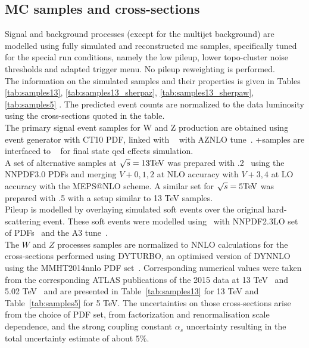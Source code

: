     \subsection{MC samples and cross-sections}
    Signal and background processes (except for the multijet background) are modelled using fully simulated and reconstructed \gls{mc} samples, specifically tuned for the special run conditions, namely the low pileup, lower topo-cluster noise thresholds and adapted trigger menu. No pileup reweighting is performed.\\
    The information on the simulated samples and their properties is given in Tables \ref{tab:samples13}, \ref{tab:samples13_sherpaz}, \ref{tab:samples13_sherpaw},  \ref{tab:samples5} \cite{Kretzschmar:2657141}. The predicted event counts are normalized to the data luminosity using the cross-sections quoted in the table.\\
    The primary signal event samples for W and Z production are obtained using \Powheg~\cite{Nason:2004rx,Frixione:2007vw,Alioli:2008gx,Alioli:2010xd} event generator with CT10 PDF, linked with \Pythia~\cite{pythia} with AZNLO tune~\cite{STDM-2012-23}. \Powheg+\Pythia samples are interfaced to \Photos~\cite{Golonka:2005pn}  for final state \gls{qed} effects simulation.\\
    A set of alternative samples at $\sqrt{s} = 13\text{Te\kern -0.1em V}$ was prepared with .2~\cite{Hoche:2010kg} using the NNPDF3.0 PDFs and merging
    $V+0,1,2$ at NLO accuracy with $V+3,4$ at LO accuracy with the MEPS@NLO scheme. A similar set for $\sqrt{s} = 5\text{Te\kern -0.1em V}$ was prepared with .5 with a setup similar to 13 TeV samples.\\
    Pileup is modelled by overlaying simulated soft events over the original hard-scattering event. These soft events were modelled using \Pythia\ with NNPDF2.3LO set of PDFs~\cite{Ball:2012cx} and the A3 tune~\cite{ATL-PHYS-PUB-2016-017}.\\
    The $W$ and $Z$ processes samples are normalized to NNLO
    calculations for the cross-sections performed using DYTURBO, an optimised version
    of DYNNLO~\cite{Catani:2007vq,Catani:2009sm} using the MMHT2014nnlo PDF
    set~\cite{Harland-Lang:2014zoa}. Corresponding numerical values were taken from
    the corresponding ATLAS publications of the 2015 data at 13
    TeV~\cite{STDM-2015-03} and 5.02 TeV~\cite{HION-2018-02} and are presented in Table~\ref{tab:samples13} for 13 TeV and Table~\ref{tab:samples5} for 5 TeV. The
    uncertainties on those cross-sections arise from the choice of PDF set, from factorization
    and renormalisation scale dependence, and the strong
    coupling constant $\alpha_s$ uncertainty resulting in the total 
    uncertainty estimate of about $5\%$.
    
